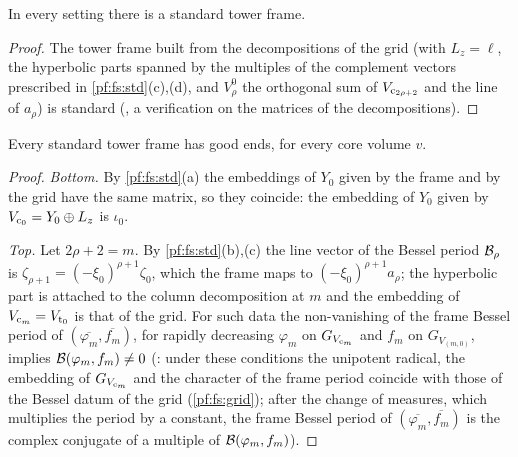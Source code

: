 \begin{lemma}\label{pf:fs:stdEx}
In every setting there is a standard tower frame.
\end{lemma}

\begin{proof}
The tower frame built from the decompositions of the grid (with $L_z=\ell$, the hyperbolic parts spanned by the multiples of the
complement vectors prescribed in \cref{pf:fs:std}(c),(d), and $V^0_\rho$ the orthogonal sum of $V_{\mathrm{c}_{2\rho+2}}$ and the line of $a_\rho$)
is standard (, a verification on the matrices of the decompositions).
\end{proof}

\begin{lemma}\label{pf:fs:ends}
Every standard tower frame has good ends, for every core volume $v$.
\end{lemma}

\begin{proof}
\emph{Bottom.} By \cref{pf:fs:std}(a) the embeddings of $Y_0$ given by the frame and by the grid have the same matrix, so they coincide:
the embedding of $Y_0$ given by $V_{\mathrm{c}_0}=Y_0\oplus L_z$ is $\iota_0$.

\emph{Top.} Let $2\rho+2=m$. By \cref{pf:fs:std}(b),(c) the line vector of the Bessel period $\mathcal B_\rho$ is
$\zeta_{\rho+1}=(-\xi_0)^{\rho+1}\zeta_0$, which the frame maps to $(-\xi_0)^{\rho+1}a_\rho$; the hyperbolic part is attached to the column
decomposition at $m$ and the embedding of $V_{\mathrm{c}_m}=V_{\mathrm{t}_0}$ is that of the grid. For such data the non-vanishing of the frame
Bessel period of $(\overline{\varphi_m},\overline{f_m})$, for rapidly decreasing $\varphi_m$ on $G_{V_{\mathrm{c}_m}}$ and $f_m$ on $G_{V_{(m,0)}}$,
implies $\mathcal B(\varphi_m,f_m)\ne0$ (: under these conditions the unipotent radical, the embedding of
$G_{V_{\mathrm{c}_m}}$ and the character of the frame period coincide with those of the Bessel datum of the grid (\cref{pf:fs:grid}); after the change
of measures, which multiplies the period by a constant, the frame Bessel period of $(\overline{\varphi_m},\overline{f_m})$ is the complex
conjugate of a multiple of $\mathcal B(\varphi_m,f_m)$).
\end{proof}

